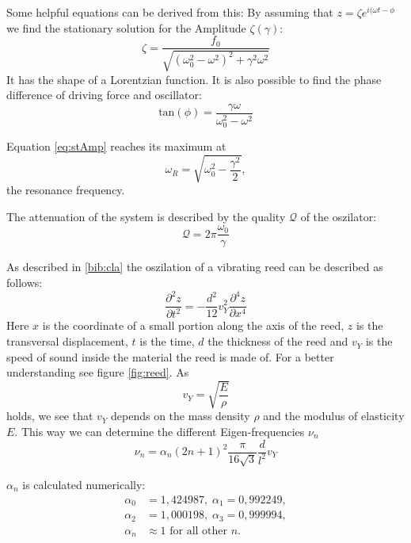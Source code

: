 \documentclass[a4paper,12pt]{article}
\begin{document}
Some helpful equations can be derived from this:
By assuming that $z = \zeta e^{i(\omega t - \phi}$ we find the stationary solution for the Amplitude $\zeta (\gamma)$:
\begin{equation}
 \zeta = \frac{f_0}{\sqrt{(\omega_0^2 - \omega^2)^2 + \gamma^2\omega^2}}
\end{equation}
It has the shape of a Lorentzian function.
It is also possible to find the phase difference of driving force and oscillator:
\begin{equation}
 \mathrm{tan}(\phi) = \frac{\gamma\omega}{\omega_0^2 - \omega^2}
\end{equation}

Equation \ref{eq:stAmp} reaches its maximum at
\begin{equation}
 \omega_R = \sqrt{\omega_0^2 - \frac{\gamma^2}{2}} \mathrm{,}
\end{equation}
the resonance frequency.

The attenuation of the system is described by the quality $\mathcal{Q}$ of the oszilator:
\begin{equation}
 \mathcal{Q} = 2\pi\frac{\omega_0}{\gamma}
\end{equation}


As described in \ref{bib:cla} the oszilation of a vibrating reed can be described as follows:
\begin{equation}
 \frac{\partial^2 z}{\partial t^2} = -\frac{d^2}{12} v_Y^2 \frac{\partial^4 z}{\partial x^4}
\end{equation}
Here $x$ is the coordinate of a small portion along the axis of the reed, $z$ is the transversal displacement, $t$ is the time, $d$ the thickness of the reed and $v_Y$ is the speed of sound inside the material the reed is made of. For a better understanding see figure \ref{fig:reed}.
As 
\begin{equation}
 v_Y = \sqrt{\frac{E}{\rho}}
\end{equation}
holds, we see that $v_Y$ depends on the mass density $\rho$ and the modulus of elasticity $E$.
This way we can determine the different Eigen-frequencies $\nu_n$
\begin{equation}
 \nu_n = \alpha_n (2n+1)^2 \frac{\pi}{16\sqrt{3}} \frac{d}{l^2} v_Y
\end{equation}

$\alpha_n$ is calculated numerically:
\begin{align}
 \alpha_0 &= 1,424987 \mathrm{,}\; \alpha_1 = 0,992249 \mathrm{,} \\ 
 \alpha_2 &= 1,000198 \mathrm{,}\; \alpha_3 = 0,999994 \mathrm{,} \\
 \alpha_n &\approx 1 \text{ for all other } n.
\end{align}
\end{document}
